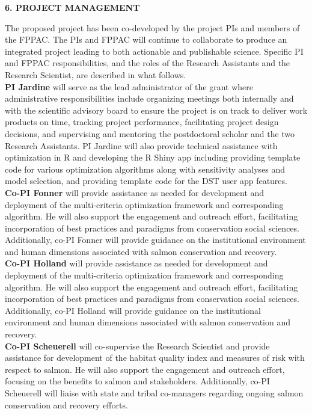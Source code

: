 \documentclass[12pt]{elsarticle}
\begin{document}
\begin{center} \textbf{6. PROJECT MANAGEMENT} \end{center}

The proposed project has been co-developed by the project PIs and members of the FPPAC. The PIs and FPPAC will continue to collaborate to produce an integrated project leading to both actionable and publishable science. Specific PI and FPPAC responsibilities, and the roles of the Research Assistants and the Research Scientist, are described in what follows.\\

\textbf{PI Jardine} will serve as the lead administrator of the grant where administrative responsibilities include organizing meetings both internally and with the scientific advisory board to ensure the project is on track to deliver work products on time, tracking project performance, facilitating project design decisions, and supervising and mentoring the postdoctoral scholar and the two Research Assistants.  PI Jardine will also provide technical assistance with optimization in R and developing the R Shiny app including providing template code for various optimization algorithms along with sensitivity analyses and model selection, and providing template code for the DST user app features.\\

\textbf{Co-PI Fonner} will provide assistance as needed for development and deployment of the multi-criteria optimization framework and corresponding algorithm. He will also support the engagement and outreach effort, facilitating incorporation of best practices and paradigms from conservation social sciences. Additionally, co-PI Fonner will provide guidance on the institutional environment and human dimensions associated with salmon conservation and recovery.\\

\textbf{Co-PI Holland} will provide assistance as needed for development and deployment of the multi-criteria optimization framework and corresponding algorithm. He will also support the engagement and outreach effort, facilitating incorporation of best practices and paradigms from conservation social sciences. Additionally, co-PI Holland will provide guidance on the institutional environment and human dimensions associated with salmon conservation and recovery.\\

\textbf{Co-PI Scheuerell} will co-supervise the Research Scientist and provide assistance for development of the habitat quality index and measures of risk with respect to salmon. He will also support the engagement and outreach effort, focusing on the benefits to salmon and stakeholders. Additionally, co-PI Scheuerell will liaise with state and tribal co-managers regarding ongoing salmon conservation and recovery efforts.\\
\end{document}

